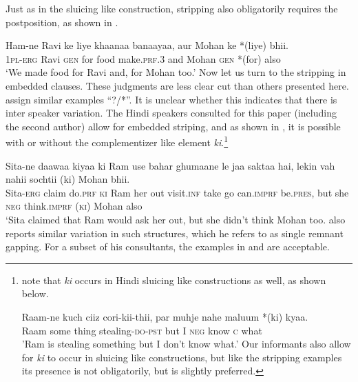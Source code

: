 \documentclass[output=paper]{langscibook}
\begin{document}
\ea \label{maex7}
    \z 
\z 
Just as in the sluicing like construction, stripping also obligatorily requires the postposition, as shown in .

\ea \label{maex8}
    \gll Ham-ne Ravi ke liye khaanaa banaayaa, aur Mohan ke *(liye) bhii.\\
    \textsc{1pl-erg} Ravi \textsc{gen} for food make.\textsc{prf.3} and Mohan \textsc{gen} *(for) also\\
    \glt `We made food for Ravi and, for Mohan too.'
\z 
Now let us turn to the stripping in embedded clauses. These judgments are less clear cut than others presented here. \cite{gribanova16} assign similar examples ``?/*''. It is unclear whether this indicates that there is inter speaker variation. The Hindi speakers consulted for this paper (including the second author) allow for embedded striping, and as shown in , it is possible with or without the complementizer like element \emph{ki}.\footnote{\cite{Bhattacharya12} note that \emph{ki} occurs in Hindi sluicing like constructions as well, as shown below.

\ea \label{maex9a}
    \gll Raam-ne kuch ciiz cori-kii-thii, par muhje nahe maluum *(ki) kyaa.\\
    Raam some thing stealing-\textsc{do-pst} but I \textsc{neg} know \textsc{c} what\\
    \glt 'Ram is stealing something but I don't know what.' \hfill \citep[199]{Bhattacharya12}
\z 
Our informants also allow for \emph{ki} to occur in sluicing like constructions, but like the stripping examples its presence is not obligatorily, but is slightly preferred.}

\ea \label{maex9}
    \gll Sita-ne daawaa kiyaa ki Ram use bahar ghumaane le jaa saktaa hai, lekin vah nahii sochtii (ki) Mohan bhii.\\
    Sita-\textsc{erg} claim do.\textsc{prf} \textsc{ki} Ram her out visit.\textsc{inf} take go can.\textsc{imprf} be.\textsc{pres}, but she \textsc{neg} think.\textsc{imprf} (\textsc{ki}) Mohan also\\
    \glt `Sita claimed that Ram would ask her out, but she didn't think Mohan too.
\z 
\cite{kush16} also reports similar variation in such structures, which he refers to as single remnant gapping. For a subset of his consultants, the examples in  and  are acceptable.
\end{document}
